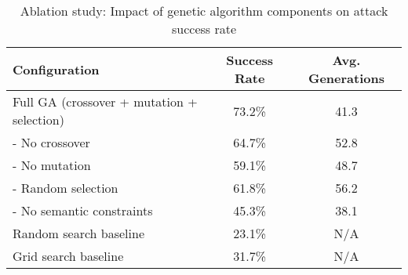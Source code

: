 \begin{table}[t]
\centering
\small
\caption{Ablation study: Impact of genetic algorithm components on attack success rate}
\begin{tabular}{lcc}
\toprule
\textbf{Configuration} & \textbf{Success Rate} & \textbf{Avg. Generations} \\
\midrule
Full GA (crossover + mutation + selection) & 73.2\% & 41.3 \\
\quad - No crossover & 64.7\% & 52.8 \\
\quad - No mutation & 59.1\% & 48.7 \\
\quad - Random selection & 61.8\% & 56.2 \\
\quad - No semantic constraints & 45.3\% & 38.1 \\
\midrule
Random search baseline & 23.1\% & N/A \\
Grid search baseline & 31.7\% & N/A \\
\bottomrule
\end{tabular}
\label{tab:ablation-study}
\end{table}